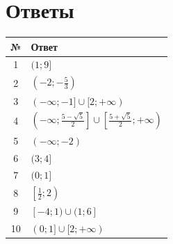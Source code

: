 \documentclass[a4paper,12pt]{article}
\begin{document}
\newpage

\section*{Ответы}

\renewcommand{\arraystretch}{1.35}
\begin{tabularx}{\linewidth}{@{}cX@{}}
\toprule
№ & Ответ \\
\midrule
1 & \((1;9]\) \\
2 & \((-2;-\frac53)\) \\
3 & \((-\infty;-1]\cup[2;+\infty)\) \\
4 & \(\left(-\infty;\frac{5-\sqrt5}{2}\right]\cup\left[\frac{5+\sqrt5}{2};+\infty\right)\) \\
5 & \((-\infty;-2)\) \\
6 & \((3;4]\) \\
7 & \((0;1]\) \\
8 & \(\left[\frac12;2\right)\) \\
9 & \([-4;1)\cup(1;6]\) \\
10 & \((0;1]\cup[2;+\infty)\) \\
\bottomrule
\end{tabularx}
\end{document}
